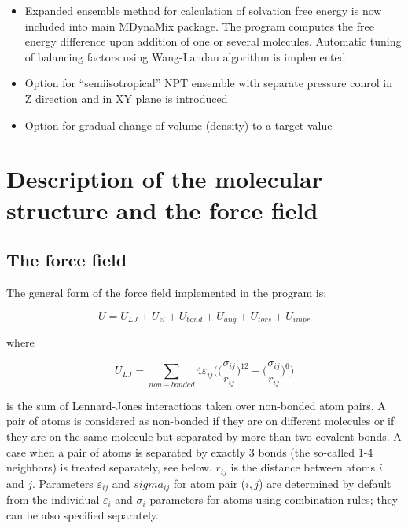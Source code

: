 \documentclass{article}
\begin{document}
\begin{itemize}
\item
Expanded ensemble method for calculation of solvation free energy 
is now included into main MDynaMix package. The program computes 
the free energy difference upon addition of one or several molecules.
Automatic tuning of balancing factors using Wang-Landau algorithm 
is implemented

\item
Option for ``semiisotropical'' NPT ensemble with separate pressure conrol 
in Z direction and in XY plane is introduced

\item
Option for gradual change of volume (density) to a target value 

\end{itemize}


\section{Description of the molecular structure and the force field}

\subsection{The force field}

The general form of the force field implemented in the program is:

\begin{equation}
\label{FF}
U = U_{LJ} + U_{el} + U_{bond} + U_{ang} + U_{tors} + U_{impr}
\end{equation}

where

\begin{equation}
U_{LJ} = \sum_{non-bonded}4\varepsilon_{ij}\Big(\big(\frac{
\sigma_{ij}}{r_{ij}}\big)^{12}-\big(\frac{\sigma_{ij}}{r_{ij}}\big)^6\Big)
\end{equation}

\noindent
is the sum of Lennard-Jones interactions taken over non-bonded atom
pairs. A pair of atoms is considered as non-bonded if they are on
different molecules or if they are on the same molecule but separated by more
than two covalent bonds. A case when a pair of atoms is separated by exactly 
3 bonds (the so-called 1-4 neighbors) is treated separately, see below.
$r_{ij}$ is the distance between atoms $i$ and $j$. Parameters 
$\varepsilon_{ij}$ and $sigma_{ij}$ for atom pair ($i,j$) are determined
by default from the individual $\varepsilon_i$ and $\sigma_i$ parameters
for atoms using combination rules; they can be also specified separately.
\end{document}

